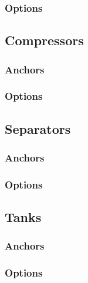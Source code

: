 \documentclass[a4paper, twoside]{article}
\begin{document}
        \subsubsection{Options}
            

    \subsection{Compressors}
        \subsubsection{Anchors}
            

        \subsubsection{Options}
            

    \subsection{Separators}
        \subsubsection{Anchors}
            

        \subsubsection{Options}
            

    \subsection{Tanks}
        \subsubsection{Anchors}
            

        \subsubsection{Options}
            
\end{document}
